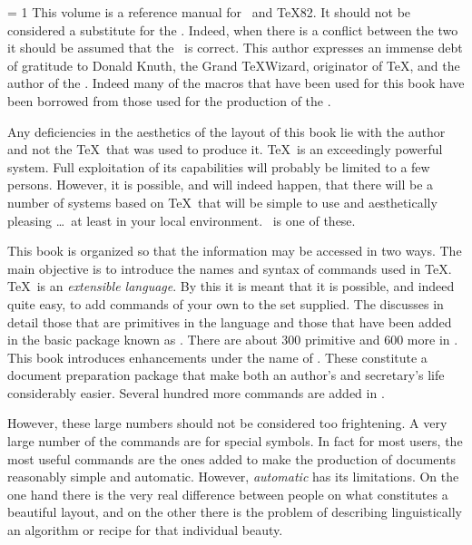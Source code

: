 

  \relax \fi %
\tenpoint
\romanpagenumber = 1
\opencitationtagfile
\beginprelude
{} \specialpagestyle
This volume is a reference manual for \intex\ and \TeX82. It should not be considered a
substitute for the \texbook. Indeed, when there is a conflict between the two
it should be assumed that the \texbook\ is correct. This author expresses an
immense debt of gratitude to 
Donald Knuth, the Grand \TeX Wizard, originator of \TeX, and the
author of the \texbook[\cite{[Knut84]}]. Indeed many of the macros that have been used for
this book have been borrowed from those used for the production of the
\texbook. 

Any deficiencies in the aesthetics of the layout of this book lie with the
author and not the \TeX\ that was used to produce it. \TeX\ is an exceedingly
powerful system. Full exploitation of its capabilities will probably be
limited to a few persons. However, it is possible, and will indeed happen,
that there will be a number of systems based on \TeX\ that will be simple to
use and aesthetically pleasing \dots\ at least in your local environment. 
\intex\ is one of these. 

This book is organized so that the information may be accessed in two ways.
The main objective is to introduce the names and syntax of commands used
in \TeX. \TeX\ is an {\it extensible language}. By this it is meant that it is
possible, and indeed quite easy, to add commands of your own to the set
supplied. The \texbook[\cite{[Knut84]}] discusses in 
detail those that are primitives in the
language and those that have been added in the basic package known as
\plain. There are about 300 primitive and 600 more in \plain. This book
introduces enhancements under the name of \intex. These constitute a document
preparation package that make both an author's and secretary's life
considerably easier. Several hundred more commands are added in \intex.


However, these large numbers should not be considered too frightening. A very
large number of the commands are for special symbols. In fact for most users,
the most useful commands are the ones added
to make the production of documents reasonably simple and automatic. However,
{\it automatic} has its limitations. On the one hand there is the very real
difference between people on what constitutes a beautiful layout, and on the
other there is the problem of describing linguistically an algorithm or
recipe for that individual beauty. 

